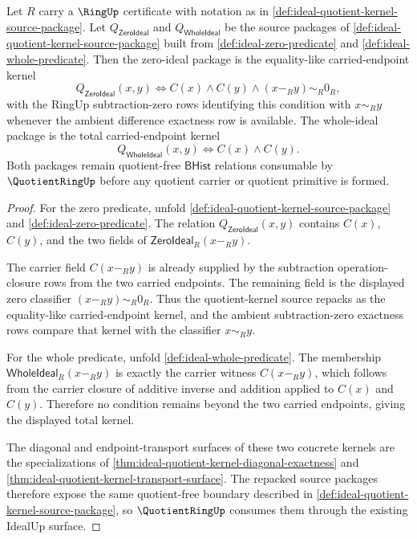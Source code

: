 \begin{theorem}
\label{thm:ideal-zero-and-whole-quotient-kernel-scope}
Let $R$ carry a $\RingUp$ certificate with notation as in \autoref{def:ideal-quotient-kernel-source-package}. Let $Q_{\mathsf{ZeroIdeal}}$ and $Q_{\mathsf{WholeIdeal}}$ be the source packages of \autoref{def:ideal-quotient-kernel-source-package} built from \autoref{def:ideal-zero-predicate} and \autoref{def:ideal-whole-predicate}. Then the zero-ideal package is the equality-like carried-endpoint kernel
$$
Q_{\mathsf{ZeroIdeal}}(x,y)\Longleftrightarrow C(x)\land C(y)\land (x-_R y)\sim_R0_R,
$$
with the RingUp subtraction-zero rows identifying this condition with $x\sim_Ry$ whenever the ambient difference exactness row is available. The whole-ideal package is the total carried-endpoint kernel
$$
Q_{\mathsf{WholeIdeal}}(x,y)\Longleftrightarrow C(x)\land C(y).
$$
Both packages remain quotient-free $\mathsf{BHist}$ relations consumable by $\QuotientRingUp$ before any quotient carrier or quotient primitive is formed.
\end{theorem}
\begin{proof}
For the zero predicate, unfold \autoref{def:ideal-quotient-kernel-source-package} and \autoref{def:ideal-zero-predicate}. The relation $Q_{\mathsf{ZeroIdeal}}(x,y)$ contains $C(x)$, $C(y)$, and the two fields of $\mathsf{ZeroIdeal}_R(x-_R y)$.

The carrier field $C(x-_R y)$ is already supplied by the subtraction operation-closure rows from the two carried endpoints. The remaining field is the displayed zero classifier $(x-_R y)\sim_R0_R$. Thus the quotient-kernel source repacks as the equality-like carried-endpoint kernel, and the ambient subtraction-zero exactness rows compare that kernel with the classifier $x\sim_Ry$.

For the whole predicate, unfold \autoref{def:ideal-whole-predicate}. The membership $\mathsf{WholeIdeal}_R(x-_R y)$ is exactly the carrier witness $C(x-_R y)$, which follows from the carrier closure of additive inverse and addition applied to $C(x)$ and $C(y)$. Therefore no condition remains beyond the two carried endpoints, giving the displayed total kernel.

The diagonal and endpoint-transport surfaces of these two concrete kernels are the specializations of \autoref{thm:ideal-quotient-kernel-diagonal-exactness} and \autoref{thm:ideal-quotient-kernel-transport-surface}. The repacked source packages therefore expose the same quotient-free boundary described in \autoref{def:ideal-quotient-kernel-source-package}, so $\QuotientRingUp$ consumes them through the existing IdealUp surface.
\end{proof}

